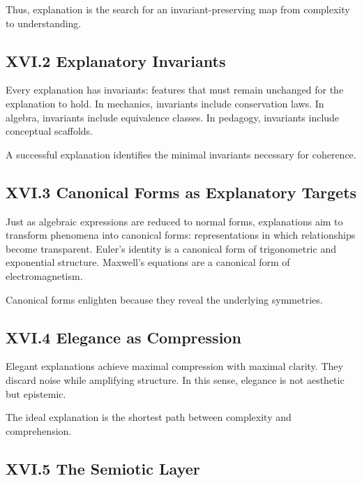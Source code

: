 \documentclass[11pt,letterpaper]{article}
\begin{document}
Thus, explanation is the search for an invariant-preserving map from complexity to understanding.

\subsection{XVI.2 Explanatory Invariants}

Every explanation has invariants: features that must remain unchanged for the explanation to hold. In mechanics, invariants include conservation laws. In algebra, invariants include equivalence classes. In pedagogy, invariants include conceptual scaffolds.

A successful explanation identifies the minimal invariants necessary for coherence.

\subsection{XVI.3 Canonical Forms as Explanatory Targets}

Just as algebraic expressions are reduced to normal forms, explanations aim to transform phenomena into canonical forms: representations in which relationships become transparent. Euler’s identity is a canonical form of trigonometric and exponential structure. Maxwell’s equations are a canonical form of electromagnetism.

Canonical forms enlighten because they reveal the underlying symmetries.

\subsection{XVI.4 Elegance as Compression}

Elegant explanations achieve maximal compression with maximal clarity. They discard noise while amplifying structure. In this sense, elegance is not aesthetic but epistemic.

The ideal explanation is the shortest path between complexity and comprehension.

\subsection{XVI.5 The Semiotic Layer}
\end{document}
